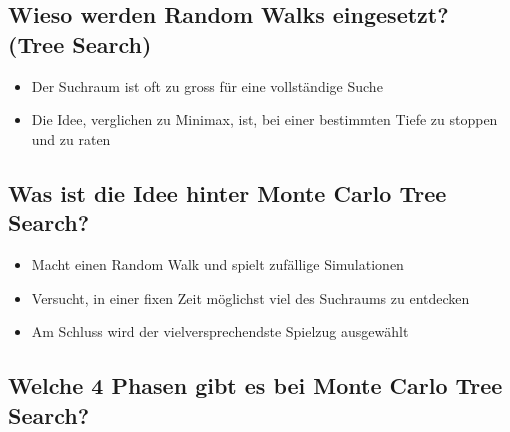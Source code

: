 \documentclass[a4paper]{article}
\begin{document}
		\subsection{Wieso werden Random Walks eingesetzt? (Tree Search)}
		
		\begin{itemize}
			\item Der Suchraum ist oft zu gross für eine vollständige Suche
			\item Die Idee, verglichen zu Minimax, ist, bei einer bestimmten Tiefe zu stoppen und zu raten
		\end{itemize}
		
		\subsection{Was ist die Idee hinter Monte Carlo Tree Search?}
		
		\begin{itemize}
			\item Macht einen Random Walk und spielt zufällige Simulationen
			\item Versucht, in einer fixen Zeit möglichst viel des Suchraums zu entdecken
			\item Am Schluss wird der vielversprechendste Spielzug ausgewählt
		\end{itemize}
	
		\subsection{Welche 4 Phasen gibt es bei Monte Carlo Tree Search?}
		
\end{document}

